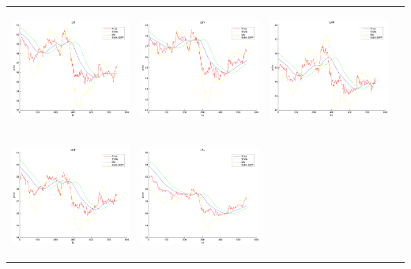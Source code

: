 \begin{tabular}{ |c|c|c|c| }
\includegraphics[width=4.0cm,height=4.0cm]{images/RealTimeFinancialTSMining/klTimeSeries/DOFilteredPriceSeries.pdf}  &
\includegraphics[width=4.0cm,height=4.0cm]{images/RealTimeFinancialTSMining/klTimeSeries/ESVFilteredPriceSeries.pdf}  &
\includegraphics[width=4.0cm,height=4.0cm]{images/RealTimeFinancialTSMining/klTimeSeries/GRPFilteredPriceSeries.pdf}   \\
\includegraphics[width=4.0cm,height=4.0cm]{images/RealTimeFinancialTSMining/klTimeSeries/GSFFilteredPriceSeries.pdf}  &
\includegraphics[width=4.0cm,height=4.0cm]{images/RealTimeFinancialTSMining/klTimeSeries/HALFilteredPriceSeries.pdf}  &

\end{tabular}
